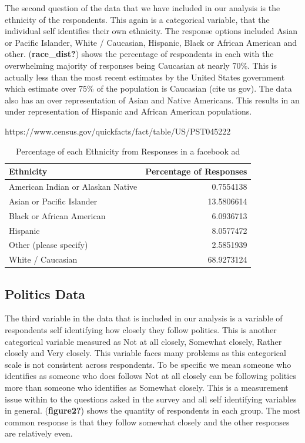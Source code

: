 \documentclass[
  letterpaper,
  DIV=11,
  numbers=noendperiod]{scrartcl}
\begin{document}
The second question of the data that we have included in our analysis is
the ethnicity of the respondents. This again is a categorical variable,
that the individual self identifies their own ethnicity. The response
options included Asian or Pacific Islander, White / Caucasian, Hispanic,
Black or African American and other. (\textbf{race\_dist?}) shows the
percentage of respondents in each with the overwhelming majority of
responses being Caucasian at nearly 70\%. This is actually less than the
most recent estimates by the United States government which estimate
over 75\% of the population is Caucasian (cite us gov). The data also
has an over representation of Asian and Native Americans. This results
in an under representation of Hispanic and African American populations.

https://www.census.gov/quickfacts/fact/table/US/PST045222

\begin{longtable}[]{@{}lr@{}}

\caption{\label{tbl-race\_dist}Percentage of each Ethnicity from
Responses in a facebook ad}

\tabularnewline

\toprule\noalign{}
Ethnicity & Percentage of Responses \\
\midrule\noalign{}
\endhead
\bottomrule\noalign{}
\endlastfoot
American Indian or Alaskan Native & 0.7554138 \\
Asian or Pacific Islander & 13.5806614 \\
Black or African American & 6.0936713 \\
Hispanic & 8.0577472 \\
Other (please specify) & 2.5851939 \\
White / Caucasian & 68.9273124 \\

\end{longtable}

\subsection{Politics Data}\label{sec-pol_data}

The third variable in the data that is included in our analysis is a
variable of respondents self identifying how closely they follow
politics. This is another categorical variable measured as Not at all
closely, Somewhat closely, Rather closely and Very closely. This
variable faces many problems as this categorical scale is not consistent
across respondents. To be specific we mean someone who identifies as
someone who does follows Not at all closely can be following politics
more than someone who identifies as Somewhat closely. This is a
measurement issue within to the questions asked in the survey and all
self identifying variables in general. (\textbf{figure2?}) shows the
quantity of respondents in each group. The most common response is that
they follow somewhat closely and the other responses are relatively
even.
\end{document}
